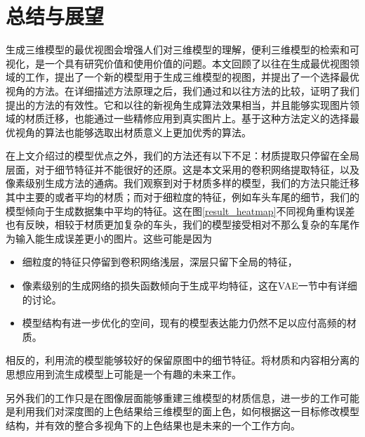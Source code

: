 \documentclass[UTF8,openany,AutoFakeBold,AutoFakeSlant,cs4size]{ctexbook}
\begin{document}
\clearpage

\chapter{总结与展望}

生成三维模型的最优视图会增强人们对三维模型的理解，便利三维模型的检索和可视化，是一个具有研究价值和使用价值的问题。本文回顾了以往在生成最优视图领域的工作，提出了一个新的模型用于生成三维模型的视图，并提出了一个选择最优视角的方法。在详细描述方法原理之后，我们通过和以往方法的比较，证明了我们提出的方法的有效性。它和以往的新视角生成算法效果相当，并且能够实现图片领域的材质迁移，也能通过一些精修应用到真实图片上。基于这种方法定义的选择最优视角的算法也能够选取出材质意义上更加优秀的算法。

在上文介绍过的模型优点之外，我们的方法还有以下不足：材质提取只停留在全局层面，对于细节特征并不能很好的还原。这是本文采用的卷积网络提取特征，以及像素级别生成方法的通病。我们观察到对于材质多样的模型，我们的方法只能迁移其中主要的或者平均的材质；而对于细粒度的特征，例如车头车尾的细节，我们的模型倾向于生成数据集中平均的特征。这在图\ref{result_heatmap}不同视角重构误差也有反映，相较于材质更加复杂的车头，我们的模型接受相对不那么复杂的车尾作为输入能生成误差更小的图片。这些可能是因为
\begin{itemize}
	\item 细粒度的特征只停留到卷积网络浅层，深层只留下全局的特征，
	\item 像素级别的生成网络的损失函数倾向于生成平均特征，这在VAE一节中有详细的讨论。
	\item 模型结构有进一步优化的空间，现有的模型表达能力仍然不足以应付高频的材质。
\end{itemize}
相反的，利用流的模型能够较好的保留原图中的细节特征。将材质和内容相分离的思想应用到流生成模型上可能是一个有趣的未来工作。

另外我们的工作只是在图像层面能够重建三维模型的材质信息，进一步的工作可能是利用我们对深度图的上色结果给三维模型的面上色，如何根据这一目标修改模型结构，并有效的整合多视角下的上色结果也是未来的一个工作方向。





\clearpage


{
	\fancyhf{}
	\fancyfoot[CO,CE]{~\thepage~}
	\renewcommand{\headrulewidth}{0.7pt}
	\renewcommand{\footrulewidth}{0pt}
}
\fancyhf{}
\fancyfoot[CO,CE]{~\thepage~}
\renewcommand{\headrulewidth}{0.7pt}
\renewcommand{\footrulewidth}{0pt}
\end{document}
